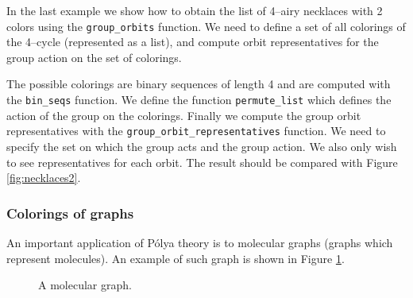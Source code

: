 \documentclass[11pt]{article}
\newcommand{\command}[1]{\texttt{#1}}
\begin{document}
In the last example we show how to obtain the list of 4--airy necklaces
with 2 colors using the \command{group\_orbits} function. We need to
define a set of all colorings of the 4--cycle (represented as a list),
and compute orbit representatives for the group action on the set of
colorings.

The possible colorings are binary sequences of length 4 and are
computed with the \command{bin\_seqs} function. We define the function
\command{permute\_list} which defines the action of the group on the
colorings. Finally we compute the group orbit representatives with the
\command{group\_orbit\_representatives} function. We need to specify
the set on which the group acts and the group action. We also only
wish to see representatives for each orbit. The result should be
compared with Figure \ref{fig:necklaces2}.


\subsubsection{Colorings of graphs}

An important application of P\'olya theory is to molecular graphs
(graphs which represent molecules). An example of such graph
is shown in Figure \ref{fig:mgraph}.

\begin{figure}
\begin{center}
\end{center}
\caption{A molecular graph.}
\label{fig:mgraph}
\end{figure}
\end{document}

